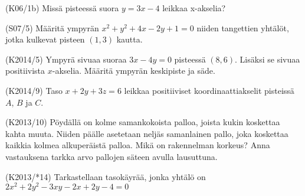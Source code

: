 \begin{tehtava}(K06/1b)
	Missä pisteessä suora $y=3x-4$ leikkaa x-akselia? 
\end{tehtava}

\begin{tehtava} (S07/5)
	Määritä ympyrän $x^2+y^2+4x-2y+1=0$ niiden tangettien yhtälöt, jotka kulkevat pisteen $(1,3)$ kautta.
\end{tehtava}



\begin{tehtava}(K2014/5)
Ympyrä sivuaa suoraa $3x-4y=0$ pisteessä $(8,6)$. Lisäksi se sivuaa positiivista $x$-akselia.
Määritä ympyrän keskipiste ja säde. 
\end{tehtava}


\begin{tehtava}(K2014/9)
Taso $x+2y+3z=6$ leikkaa positiiviset koordinaattiakselit pisteissä $A$, $B$ ja $C$.
\begin{alakohdat}
	\end{alakohdat}
\end{tehtava}

\begin{tehtava}(K2013/10)
Pöydällä on kolme samankokoista palloa, joista kukin koskettaa kahta muuta. Niiden päälle asetetaan neljäs samanlainen  pallo, joka koskettaa kaikkia kolmea alkuperäistä palloa.
Mikä on rakennelman korkeus? Anna vastauksena tarkka arvo pallojen säteen avulla lausuttuna. 
\end{tehtava}

\begin{tehtava} (K2013/*14)
Tarkastellaan tasokäyrää, jonka yhtälö on $2x^2+2y^2-3xy-2x+2y-4=0$
\begin{alakohdat}
	\end{alakohdat}
\end{tehtava}

